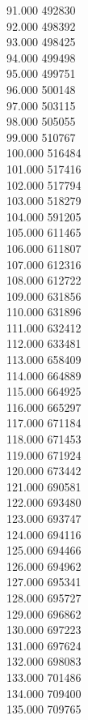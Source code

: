 { 91.000	492830 \\
 92.000	498392 \\
 93.000	498425 \\
 94.000	499498 \\
 95.000	499751 \\
 96.000	500148 \\
 97.000	503115 \\
 98.000	505055 \\
 99.000	510767 \\
 100.000	516484 \\
 101.000	517416 \\
 102.000	517794 \\
 103.000	518279 \\
 104.000	591205 \\
 105.000	611465 \\
 106.000	611807 \\
 107.000	612316 \\
 108.000	612722 \\
 109.000	631856 \\
 110.000	631896 \\
 111.000	632412 \\
 112.000	633481 \\
 113.000	658409 \\
 114.000	664889 \\
 115.000	664925 \\
 116.000	665297 \\
 117.000	671184 \\
 118.000	671453 \\
 119.000	671924 \\
 120.000	673442 \\
 121.000	690581 \\
 122.000	693480 \\
 123.000	693747 \\
 124.000	694116 \\
 125.000	694466 \\
 126.000	694962 \\
 127.000	695341 \\
 128.000	695727 \\
 129.000	696862 \\
 130.000	697223 \\
 131.000	697624 \\
 132.000	698083 \\
 133.000	701486 \\
 134.000	709400 \\
 135.000	709765 \\
}
